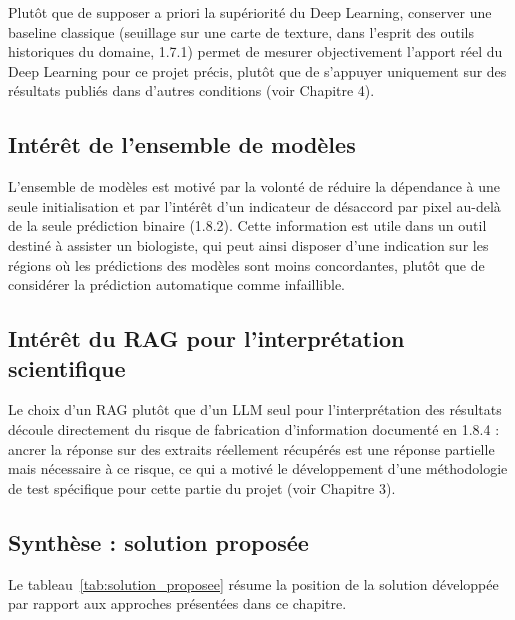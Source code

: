 \documentclass[12pt,a4paper]{report}
\begin{document}
Plutôt que de supposer a priori la supériorité du Deep Learning, conserver une baseline classique (seuillage sur une carte de texture, dans l'esprit des outils historiques du domaine, 1.7.1) permet de mesurer objectivement l'apport réel du Deep Learning pour ce projet précis, plutôt que de s'appuyer uniquement sur des résultats publiés dans d'autres conditions (voir Chapitre 4).

\subsection{Intérêt de l'ensemble de modèles}

L'ensemble de modèles est motivé par la volonté de réduire la dépendance à une seule initialisation et par l'intérêt d'un indicateur de désaccord par pixel au-delà de la seule prédiction binaire (1.8.2). Cette information est utile dans un outil destiné à assister un biologiste, qui peut ainsi disposer d'une indication sur les régions où les prédictions des modèles sont moins concordantes, plutôt que de considérer la prédiction automatique comme infaillible.

\subsection{Intérêt du RAG pour l'interprétation scientifique}

Le choix d'un RAG plutôt que d'un LLM seul pour l'interprétation des résultats découle directement du risque de fabrication d'information documenté en 1.8.4 : ancrer la réponse sur des extraits réellement récupérés est une réponse partielle mais nécessaire à ce risque, ce qui a motivé le développement d'une méthodologie de test spécifique pour cette partie du projet (voir Chapitre 3).

\subsection{Synthèse : solution proposée}

Le tableau~\ref{tab:solution_proposee} résume la position de la solution développée par rapport aux approches présentées dans ce chapitre.
\end{document}

